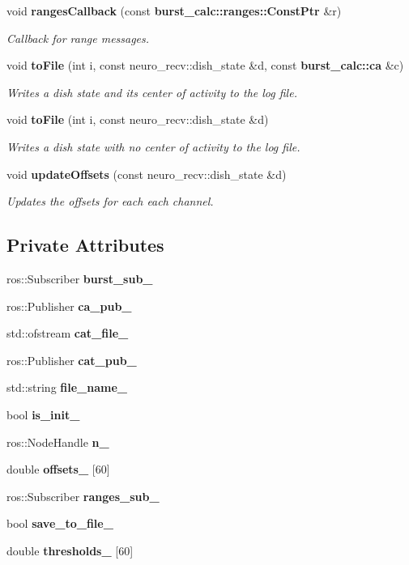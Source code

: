 \begin{DoxyCompactItemize}
void {\bf ranges\-Callback} (const {\bf burst\-\_\-calc\-::ranges\-::\-Const\-Ptr} \&r)
\begin{DoxyCompactList}\small\item\em \-Callback for range messages. \end{DoxyCompactList}\item 
void {\bf to\-File} (int i, const neuro\-\_\-recv\-::dish\-\_\-state \&d, const {\bf burst\-\_\-calc\-::ca} \&c)
\begin{DoxyCompactList}\small\item\em \-Writes a dish state and its center of activity to the log file. \end{DoxyCompactList}\item 
void {\bf to\-File} (int i, const neuro\-\_\-recv\-::dish\-\_\-state \&d)
\begin{DoxyCompactList}\small\item\em \-Writes a dish state with no center of activity to the log file. \end{DoxyCompactList}\item 
void {\bf update\-Offsets} (const neuro\-\_\-recv\-::dish\-\_\-state \&d)
\begin{DoxyCompactList}\small\item\em \-Updates the offsets for each each channel. \end{DoxyCompactList}\end{DoxyCompactItemize}
\subsection*{\-Private \-Attributes}
\begin{DoxyCompactItemize}
\item 
ros\-::\-Subscriber {\bf burst\-\_\-sub\-\_\-}
\item 
ros\-::\-Publisher {\bf ca\-\_\-pub\-\_\-}
\item 
std\-::ofstream {\bf cat\-\_\-file\-\_\-}
\item 
ros\-::\-Publisher {\bf cat\-\_\-pub\-\_\-}
\item 
std\-::string {\bf file\-\_\-name\-\_\-}
\item 
bool {\bf is\-\_\-init\-\_\-}
\item 
ros\-::\-Node\-Handle {\bf n\-\_\-}
\item 
double {\bf offsets\-\_\-} [60]
\item 
ros\-::\-Subscriber {\bf ranges\-\_\-sub\-\_\-}
\item 
bool {\bf save\-\_\-to\-\_\-file\-\_\-}
\item 
double {\bf thresholds\-\_\-} [60]
\end{DoxyCompactItemize}


